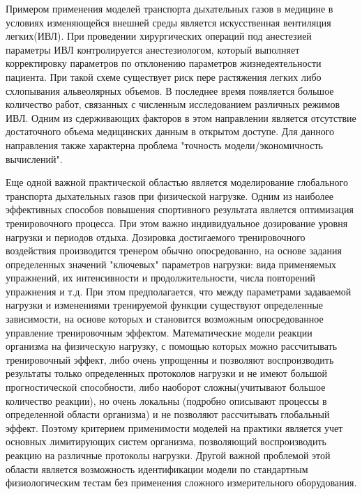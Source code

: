 Примером применения моделей транспорта дыхательных газов в медицине в условиях изменяющейся внешней среды является искусственная вентиляция легких(ИВЛ). При проведении хирургических операций под анестезией параметры ИВЛ контролируется анестезиологом, который выполняет корректировку параметров по отклонению параметров жизнедеятельности пациента. При такой схеме существует риск пере растяжения легких либо схлопывания альвеолярных объемов. В последнее время появляется большое количество работ, связанных с численным исследованием различных режимов ИВЛ. Одним из сдерживающих факторов в этом направлении является отсутствие достаточного объема медицинских данным в открытом доступе. Для данного направления также характерна проблема "точность модели/экономичность вычислений".   

Еще одной важной практической областью является моделирование глобального транспорта дыхательных газов при физической нагрузке. Одним из наиболее эффективных способов повышения спортивного результата является оптимизация тренировочного процесса. При этом важно индивидуальное дозирование уровня нагрузки и периодов отдыха. Дозировка достигаемого тренировочного воздействия производится тренером обычно опосредованно, на основе задания определенных значений "ключевых" параметров нагрузки: вида применяемых упражнений, их интенсивности и продолжительности, числа повторений упражнения и т.д. При этом предполагается, что между параметрами задаваемой нагрузки и изменениями тренируемой функции существуют определенные зависимости, на основе которых и становится возможным опосредованное управление тренировочным эффектом. Математические модели реакции организма на физическую нагрузку, с помощью которых можно рассчитывать тренировочный эффект, либо очень упрощенны и позволяют воспроизводить результаты только определенных протоколов нагрузки и не имеют большой прогностической способности, либо наоборот сложны(учитывают большое количество реакции), но очень локальны (подробно описывают процессы в определенной области организма) и не позволяют рассчитывать глобальный эффект. Поэтому критерием применимости моделей на практики является учет основных лимитирующих систем организма, позволяющий воспроизводить реакцию на различные протоколы нагрузки. Другой важной проблемой этой области является возможность идентификации модели по стандартным физиологическим тестам без применения сложного измерительного оборудования. 

